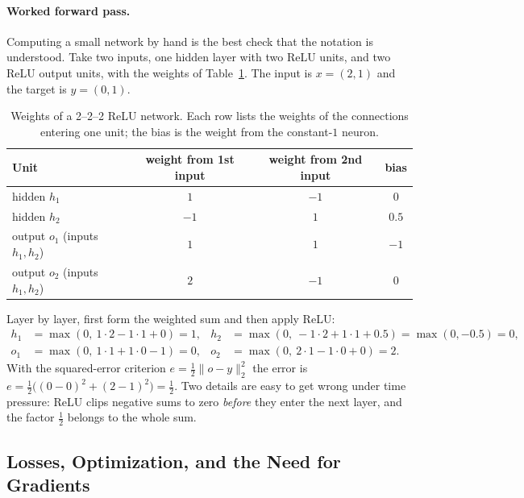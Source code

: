 \paragraph{Worked forward pass.}
Computing a small network by hand is the best check that the notation is
understood. Take two inputs, one hidden layer with two ReLU units, and two ReLU
output units, with the weights of Table~\ref{tab:mlp-example}. The input is
$x = (2,1)$ and the target is $y = (0,1)$.

\begin{table}[ht]
  \centering
  \begin{tabular}{@{}lccc@{}}
    \toprule
    Unit & weight from 1st input & weight from 2nd input & bias \\
    \midrule
    hidden $h_1$ & $1$ & $-1$ & $0$ \\
    hidden $h_2$ & $-1$ & $1$ & $0.5$ \\
    output $o_1$ (inputs $h_1,h_2$) & $1$ & $1$ & $-1$ \\
    output $o_2$ (inputs $h_1,h_2$) & $2$ & $-1$ & $0$ \\
    \bottomrule
  \end{tabular}
  \caption{Weights of a 2--2--2 ReLU network. Each row lists the weights of the
  connections entering one unit; the bias is the weight from the constant-$1$
  neuron.}
  \label{tab:mlp-example}
\end{table}

\noindent
Layer by layer, first form the weighted sum and then apply ReLU:
\begin{align*}
  h_1 &= \max(0,\ 1\cdot 2 - 1\cdot 1 + 0) = 1, &
  h_2 &= \max(0,\ -1\cdot 2 + 1\cdot 1 + 0.5) = \max(0,-0.5) = 0,\\
  o_1 &= \max(0,\ 1\cdot 1 + 1\cdot 0 - 1) = 0, &
  o_2 &= \max(0,\ 2\cdot 1 - 1\cdot 0 + 0) = 2 .
\end{align*}
\noindent
With the squared-error criterion $e = \tfrac12\lVert o - y\rVert_2^2$ the error
is $e = \tfrac12\bigl((0-0)^2 + (2-1)^2\bigr) = \tfrac12$. Two details are easy
to get wrong under time pressure: ReLU clips negative sums to zero \emph{before}
they enter the next layer, and the factor $\tfrac12$ belongs to the whole sum.

\subsection{Losses, Optimization, and the Need for Gradients}

